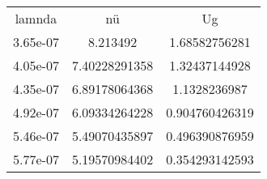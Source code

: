 \begin{table}
\begin{tabular}{ccc}
lamnda & nü & Ug \\
3.65e-07 & 8.213492 & 1.68582756281 \\
4.05e-07 & 7.40228291358 & 1.32437144928 \\
4.35e-07 & 6.89178064368 & 1.1328236987 \\
4.92e-07 & 6.09334264228 & 0.904760426319 \\
5.46e-07 & 5.49070435897 & 0.496390876959 \\
5.77e-07 & 5.19570984402 & 0.354293142593 \\
\end{tabular}
\end{table}
